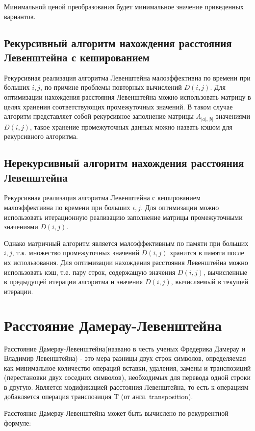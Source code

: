 \documentclass[a4paper,14pt, unknownkeysallowed]{bmstu}
\begin{document}
    Минимальной ценой преобразования будет минимальное значение приведенных вариантов.

    \subsection{Рекурсивный алгоритм нахождения расстояния Левенштейна с кешированием}

    Рекурсивная реализация алгоритма Левенштейна малоэффективна по времени при больших $i, j$, по причине проблемы повторных вычислений $D(i,j)$. Для оптимизации нахождения расстояния Левенштейна можно использовать матрицу в целях хранения соответствующих промежуточных значений. В таком случае алгоритм представляет собой рекурсивное заполнение матрицы $A_{|a|,|b|}$ значениями $D(i,j)$, такое хранение промежуточных данных можно назвать кэшом для рекурсивного алгоритма.

    \subsection{Нерекурсивный алгоритм нахождения расстояния Левенштейна}

    Рекурсивная реализация алгоритма Левенштейна с кешированием малоэффективна по времени при больших $i, j$. Для оптимизации можно использовать итерационную реализацию заполнение матрицы промежуточными значениями $D(i,j)$.

    Однако матричный алгоритм является малоэффективным по памяти при больших $i, j$, т.к. множество промежуточных значений $D(i,j)$ хранится в памяти после их использования. Для оптимизации нахождения расстояния Левенштейна можно использовать кэш, т.е. пару строк, содержащую значения $D(i,j)$, вычисленные в предыдущей итерации алгоритма и значения $D(i,j)$, вычисляемый в текущей итерации.

	\section{Расстояние Дамерау-Левенштейна}
	Расстояние Дамерау-Левенштейна(названо в честь ученых Фредерика Дамерау и Владимир Левенштейна) - это мера разницы двух строк символов, определяемая как минимальное количество операций вставки, удаления, замены и транспозиций (перестановки двух соседних символов), необходимых для перевода одной строки в другую. Является модификацией расстояния Левенштейна, то есть к операциям добавляется операция транспозиция T (от англ. transposition).

	Расстояние Дамерау-Левенштейна может быть вычислено по рекуррентной формуле:
\end{document}
